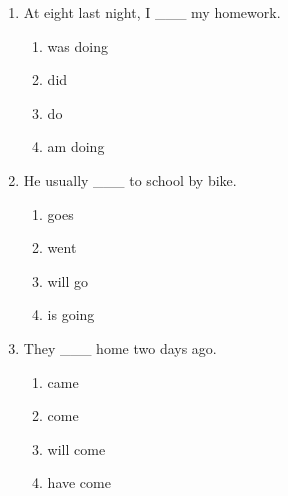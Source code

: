 \documentclass[11pt,a4paper]{ctexart}
\begin{document}
\begin{enumerate}[leftmargin=*,itemsep=4pt]
\begin{enumerate}[label=\Alph*.,leftmargin=2em,itemsep=1pt,topsep=2pt]
\end{enumerate}
\item At eight last night, I \_\_\_ my homework.
\begin{enumerate}[label=\Alph*.,leftmargin=2em,itemsep=1pt,topsep=2pt]
\item was doing
\item did
\item do
\item am doing
\end{enumerate}
\item He usually \_\_\_ to school by bike.
\begin{enumerate}[label=\Alph*.,leftmargin=2em,itemsep=1pt,topsep=2pt]
\item goes
\item went
\item will go
\item is going
\end{enumerate}
\item They \_\_\_ home two days ago.
\begin{enumerate}[label=\Alph*.,leftmargin=2em,itemsep=1pt,topsep=2pt]
\item came
\item come
\item will come
\item have come
\end{enumerate}
\end{enumerate}
\end{document}
